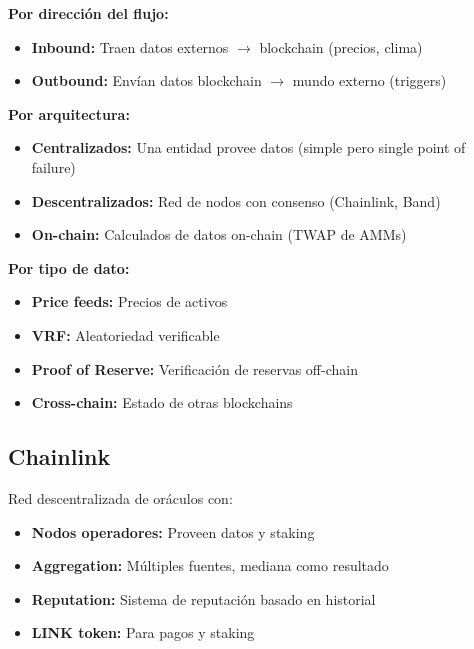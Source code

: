 \documentclass[11pt,a4paper,twoside]{book}
\begin{document}
\begin{definition}
\textbf{Por direcci\'on del flujo:}
\begin{itemize}
    \item \textbf{Inbound:} Traen datos externos $\to$ blockchain (precios, clima)
    \item \textbf{Outbound:} Env\'ian datos blockchain $\to$ mundo externo (triggers)
\end{itemize}

\textbf{Por arquitectura:}
\begin{itemize}
    \item \textbf{Centralizados:} Una entidad provee datos (simple pero single point of failure)
    \item \textbf{Descentralizados:} Red de nodos con consenso (Chainlink, Band)
    \item \textbf{On-chain:} Calculados de datos on-chain (TWAP de AMMs)
\end{itemize}

\textbf{Por tipo de dato:}
\begin{itemize}
    \item \textbf{Price feeds:} Precios de activos
    \item \textbf{VRF:} Aleatoriedad verificable
    \item \textbf{Proof of Reserve:} Verificaci\'on de reservas off-chain
    \item \textbf{Cross-chain:} Estado de otras blockchains
\end{itemize}
\end{definition}

\subsection{Chainlink}

\begin{definition}[Chainlink]
Red descentralizada de or\'aculos con:
\begin{itemize}
    \item \textbf{Nodos operadores:} Proveen datos y staking
    \item \textbf{Aggregation:} M\'ultiples fuentes, mediana como resultado
    \item \textbf{Reputation:} Sistema de reputaci\'on basado en historial
    \item \textbf{LINK token:} Para pagos y staking
\end{itemize}
\end{definition}
\end{document}
